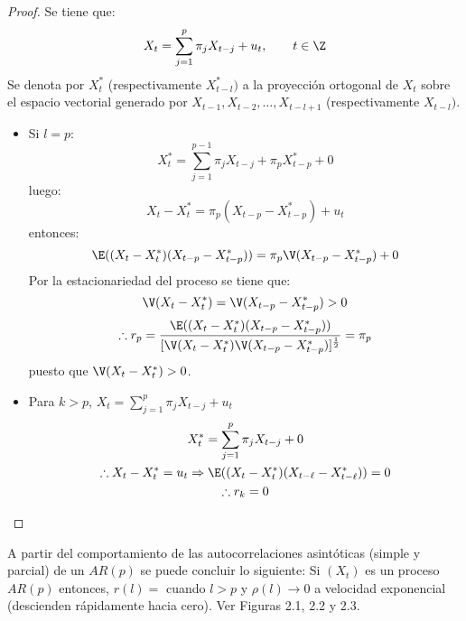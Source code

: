 \begin{proof}
Se tiene que:
\[
X_{t} =\sum_{j=1}^p {\pi_{j} X_{t-j} +u_{t} } ,
\qquad
t\in \Z
\]
Se denota por $X_{t}^{\ast } $ (respectivamente $X_{t-l}^{\ast })$ a la 
proyecci\'{o}n ortogonal de $X_{t}$ sobre el espacio vectorial generado por 
$X_{t-1}, X_{t-2},\ldots ,X_{t-l+1}$ (respectivamente $X_{t-l})$.

\begin{itemize}
\item Si $l=p$: 
\[
X_{t}^{\ast } =\sum_{j=1}^{p-1} {\pi_{j} X_{t-j} +\pi_{p} 
X_{t-p}^{\ast } +0} 
\]
luego: 
\[
X_{t} -X_{t}^{\ast } =\pi_{p} (X_{t-p} -X_{t-p}^{\ast } )+u_{t} 
\]
entonces: 
\[
\E((X_{t} -X_{t}^{\ast } )(X_{t-p} -X_{t-p}^{\ast } ))=\pi_{p} \V(X_{t-p} 
-X_{t-p}^{\ast } )+0
\]
Por la estacionariedad del proceso se tiene que:
\[
\V(X_{t} -X_{t}^{\ast } )=\V(X_{t-p} -X_{t-p}^{\ast } )>0
\]
\[
\therefore r_{p} =\frac{\E((X_{t} -X_{t}^{\ast } )(X_{t-p} -X_{t-p}^{\ast } 
))}{[\V(X_{t} -X_{t}^{\ast } )\V(X_{t-p} -X_{t-p}^{\ast } 
)]^{\frac{1}{2}}}=\pi_{p} 
\]
puesto que $\V(X_{t} -X_{t}^{\ast } )>0$.

\item Para $k>p$, $X_{t} =\sum_{j=1}^p {\pi_{j} X_{t-j} +u_{t} } $
\begin{gather*}
X_{t}^{\ast } =\sum_{j=1}^p {\pi_{j} X_{t-j} } +0\\
\therefore X_{t} -X_{t}^{\ast } =u_{t} \Rightarrow \E((X_{t} -X_{t}^{\ast } )(X_{t-\ell } -X_{t-\ell }^{\ast } ))=0\\
\therefore r_{k} =0\qedhere
\end{gather*}
\end{itemize}
\end{proof}

\begin{observacion} A partir del comportamiento de las autocorrelaciones asint\'{o}ticas (simple y parcial) de un $AR(p)$ se puede concluir lo siguiente: Si $(X_{t})$ es un proceso $AR(p)$ entonces, $r(l)=$ cuando $l>p$ y $\rho (l)\to 0$ a velocidad exponencial (descienden r\'{a}pidamente hacia cero). Ver Figuras 2.1, 2.2 y 
2.3.
\end{observacion}




